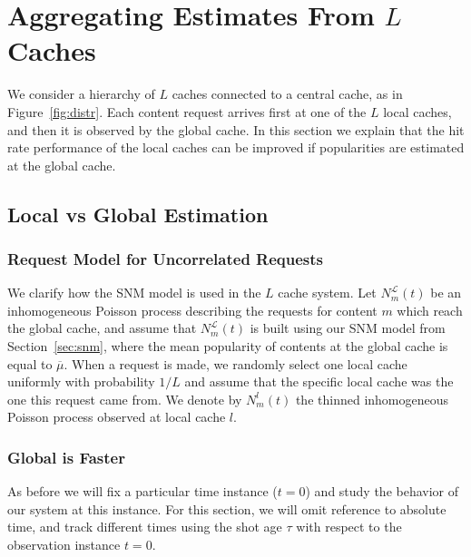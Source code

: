\documentclass[10pt, conference, letterpaper]{IEEEtran}
\newcommand{\spyros}[1]{{#1}}
\begin{document}
\section{Aggregating Estimates From $L$ Caches}

We consider a hierarchy of $L$ caches connected to a central cache, as in  Figure~\ref{fig:distr}. 
Each content request arrives first at one of the $L$ local caches, and then it is observed by the global cache. 
In this section we explain that the hit rate performance of the local caches can be improved if popularities are estimated at the global cache.





 







\subsection{Local vs Global Estimation}

\subsubsection{Request Model for Uncorrelated Requests}\label{sec:model2}

We clarify how the SNM model is used in the $L$ cache system. Let $N^{\mathcal L}_m(t)$ be an inhomogeneous Poisson process describing the requests for content $m$ which reach the global cache, and assume that $N^{\mathcal L}_m(t)$ is built using our SNM model from Section~\ref{sec:snm}, where the mean popularity of contents at the global cache is equal to $\overline\mu$. 
When a request is made, we randomly select one local cache uniformly with probability $1/L$ and assume that the specific local cache \spyros {was the one this request came from}. We denote by ${N}_m^l(t)$ the thinned inhomogeneous Poisson process observed at local cache $l$.

\subsubsection{Global is Faster}
As before we will fix a particular time instance ($t=0$) and study the behavior of our system at this instance. For this section, we will omit reference to absolute time, and track different times using the shot age $\tau$ with respect to the observation instance $t=0$.
\end{document}
